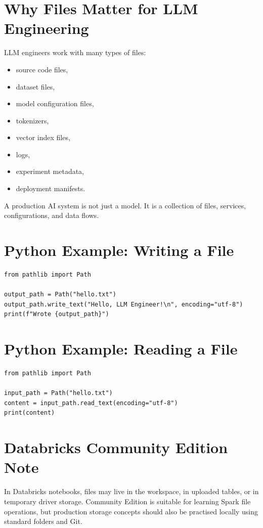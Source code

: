 \section{Why Files Matter for LLM Engineering}

LLM engineers work with many types of files:

\begin{itemize}
    \item source code files,
    \item dataset files,
    \item model configuration files,
    \item tokenizers,
    \item vector index files,
    \item logs,
    \item experiment metadata,
    \item deployment manifests.
\end{itemize}

A production AI system is not just a model. It is a collection of files, services, configurations, and data flows.

\section{Python Example: Writing a File}

\begin{lstlisting}
from pathlib import Path

output_path = Path("hello.txt")
output_path.write_text("Hello, LLM Engineer!\n", encoding="utf-8")
print(f"Wrote {output_path}")
\end{lstlisting}

\section{Python Example: Reading a File}

\begin{lstlisting}
from pathlib import Path

input_path = Path("hello.txt")
content = input_path.read_text(encoding="utf-8")
print(content)
\end{lstlisting}

\section{Databricks Community Edition Note}

In Databricks notebooks, files may live in the workspace, in uploaded tables, or in temporary driver storage. Community Edition is suitable for learning Spark file operations, but production storage concepts should also be practised locally using standard folders and Git.


